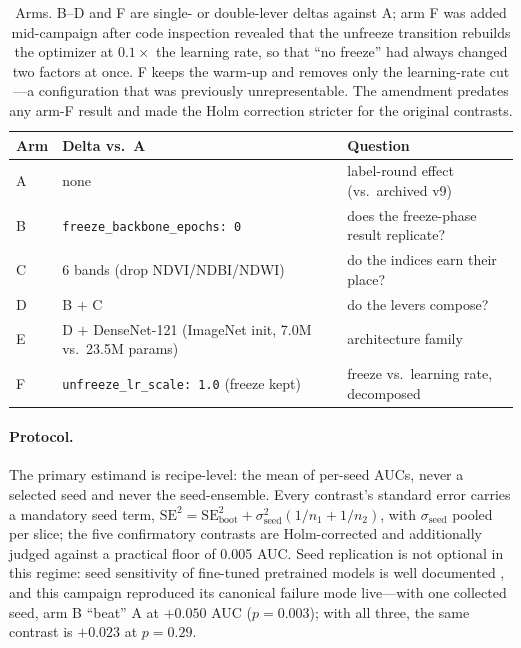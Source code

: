 \documentclass[11pt,a4paper]{article}
\newcommand{\code}[1]{\texttt{\small #1}}
\begin{document}
\begin{table}[t]
\centering
\small
\caption{Arms. B--D and F are single- or double-lever deltas against A;
arm F was added mid-campaign after code inspection revealed that the unfreeze
transition rebuilds the optimizer at $0.1\times$ the learning rate, so that
``no freeze'' had always changed two factors at once. F keeps the warm-up and
removes only the learning-rate cut---a configuration that was previously
unrepresentable. The amendment predates any arm-F result and made the
Holm correction stricter for the original contrasts.}
\label{tab:r4arms}
\begin{tabular}{lll}
\toprule
Arm & Delta vs.\ A & Question \\
\midrule
A & none & label-round effect (vs.\ archived v9) \\
B & \code{freeze\_backbone\_epochs: 0} & does the freeze-phase result replicate? \\
C & 6 bands (drop NDVI/NDBI/NDWI) & do the indices earn their place? \\
D & B $+$ C & do the levers compose? \\
E & D $+$ DenseNet-121 (ImageNet init, 7.0M vs.\ 23.5M params) & architecture family \\
F & \code{unfreeze\_lr\_scale: 1.0} (freeze kept) & freeze vs.\ learning rate, decomposed \\
\bottomrule
\end{tabular}
\end{table}

\paragraph{Protocol.} The primary estimand is recipe-level: the mean of
per-seed AUCs, never a selected seed and never the seed-ensemble. Every
contrast's standard error carries a mandatory seed term,
$\mathrm{SE}^2 = \mathrm{SE}^2_{\text{boot}} +
\sigma^2_{\text{seed}}(1/n_1{+}1/n_2)$, with $\sigma_{\text{seed}}$ pooled per
slice; the five confirmatory contrasts are Holm-corrected
\citep{holm1979simple} and additionally judged against a practical floor of
0.005 AUC. Seed replication is not optional in this regime: seed sensitivity
of fine-tuned pretrained models is well documented
\citep{dodge2020finetuning,picard2021seed}, and this campaign reproduced its
canonical failure mode live---with one collected seed, arm B ``beat'' A at
$+0.050$ AUC ($p=0.003$); with all three, the same contrast is $+0.023$ at
$p=0.29$.
\end{document}
